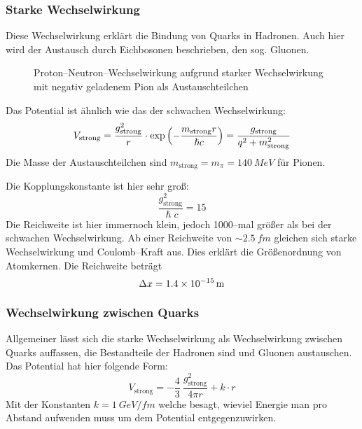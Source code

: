 \documentclass[Ex4_Zusammenfassung.tex]{subfiles}
\begin{document}
\subsubsection{Starke Wechselwirkung}
Diese Wechselwirkung erklärt die Bindung von Quarks in Hadronen. Auch hier wird der Austausch durch Eichbosonen beschrieben, den sog. Gluonen. 
\begin{figure}[H]
	\centering
	\caption{Proton--Neutron--Wechselwirkung aufgrund starker Wechselwirkung mit negativ geladenem Pion als Austauschteilchen}
\end{figure}
Das Potential ist ähnlich wie das der schwachen Wechselwirkung:
\begin{equation}
	V_{\text{strong}} = \frac{g_{\text{strong}}^2}{r} \cdot \exp\left( -\frac{m_{\text{strong}} r}{\hslash c}\right) = \frac{g_{\text{strong}}}{q^2 + m_{\text{strong}}^2}
\end{equation}
Die Masse der Austauschteilchen sind  $ m_{\text{strong}} = m_{\pi} = \SI{140}{MeV}$ für Pionen. 

Die Kopplungskonstante ist hier sehr groß:
\begin{equation}
	\frac{g_{\text{strong}}^2}{\hslash c } = 15 
\end{equation}
Die Reichweite ist hier immernoch klein, jedoch 1000--mal größer als bei der schwachen Wechselwirkung. Ab einer Reichweite von $ \sim \SI{2.5}{fm}$ gleichen sich starke Wechselwirkung und Coulomb--Kraft aus. Dies erklärt die Größenordnung von Atomkernen. Die Reichweite beträgt 
\begin{equation}
	\Delta x = \SI{1.4E-15}{m}
\end{equation}

\subsubsection{Wechselwirkung zwischen Quarks}
Allgemeiner lässt sich die starke Wechselwirkung als Wechselwirkung zwischen Quarks auffassen, die Bestandteile der Hadronen sind und Gluonen austauschen. Das Potential hat hier folgende Form: 
\begin{equation}
	V_{\text{strong}} = - \frac{4}{3} \  \frac{g_{\text{strong}}^2}{4 \pi r} + k \cdot r 
\end{equation}
Mit der Konstanten $ k = \SI{1}{GeV/fm} $ welche besagt, wieviel Energie man pro Abstand aufwenden muss um dem Potential entgegenzuwirken. 
\end{document}

